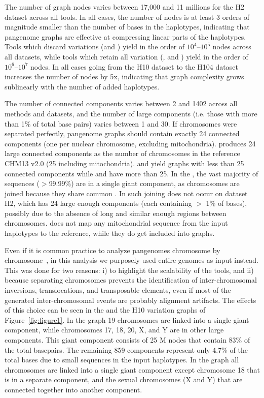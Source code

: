 The number of graph nodes varies between 17,000 and 11 millions for the H2 dataset across all tools. In all cases, the number of nodes is at least 3 orders of magnitude smaller than the number of bases in the haplotypes, indicating that pangenome graphs are effective at compressing linear parts of the haplotypes.
Tools which discard variations (\minigraph and \mdbg) yield in the order of $10^4$--$10^5$ nodes across all datasets, while tools which retain all variation (\bifrost, \mcactus and \pggb) yield in the order of $10^6$--$10^7$ nodes. In all cases going from the H10 dataset to the H104 dataset increases the number of nodes by 5x, indicating that graph complexity grows sublinearly with the number of added haplotypes.

The number of connected components varies between 2 and 1402 across all methods and datasets, and the number of large components (i.e. those with more than 1\% of total base pairs) varies between 1 and 30. 
If chromosomes were separated perfectly, pangenome graphs should contain exactly 24 connected components (one per nuclear chromosome, excluding mitochondria). \minigraph produces 24 large connected components as the number of chromosomes in the reference CHM13 v2.0 (25 including mitochondria).
\bifrost and \mcactus yield graphs with less than 25 connected components  while \mdbg and \pggb have more than 25.
In the \bifrost \dbg, the vast majority of sequences ($>$99.99\%) are in a single giant component, as chromosomes are joined because they share common \kmers. In \mdbg such joining does not occur on dataset H2, which has 24 large enough components (each containing $>$ 1\% of bases), possibly due to the absence of long and similar enough regions between chromosomes. 
\minigraph does not map any mitochondrial sequence from the input haplotypes to the reference, while they do get included into \mcactus graphs.

Even if it is common practice to analyze pangenomes chromosome by chromosome~\cite{hdpr,mcactus}, in this analysis we purposely used entire genomes as input instead. This was done for two reasons: i) to highlight the scalability of the tools, and ii) because separating chromosomes prevents the identification of inter-chromosomal inversions, translocations, and transposable elements, even if most of the generated inter-chromosomal events are probably alignment artifacts.
The effects of this choice can be seen in the \pggb and the \mcactus H10 variation graphs of Figure~\ref{fig:figure1}. In the \pggb graph 19 chromosomes are linked into a single giant component, while chromosomes 17, 18, 20, X, and Y are in other large components. This giant component consists of 25 M nodes that contain  83\% of the total basepairs. The remaining 859 components represent only 4.7\% of the total bases due to small sequences in the input haplotypes. 
In the \mcactus graph all chromosomes are linked into a single giant component except chromosome 18 that is in a separate component, and the sexual chromosomes (X and Y) that are connected together into another component.

